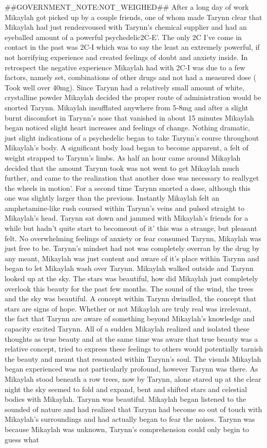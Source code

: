 \documentclass[12pt]{book}
\begin{document}
\#\#GOVERNMENT\_NOTE:NOT\_WEIGHED\#\# After a long day of work Mikaylah got picked up by a couple friends, one of whom made Tarynn clear that Mikaylah had just rendezvoused with Tarynn's chemical supplier and had an eyeballed amount of a powerful psychedelic2C-E'. The only 2C I've come in contact in the past was 2C-I which was to say the least an extremely powerful, if not horrifying experience and created feelings of doubt and anxiety inside. In retrospect the negative experience Mikaylah had with 2C-I was due to a few factors, namely set, combinations of other drugs and not had a measured dose ( Took well over 40mg). Since Tarynn had a relatively small amount of white, crystalline powder Mikaylah decided the proper route of administration would be snorted Tarynn. Mikaylah insufflated anywhere from 5-8mg and after a slight burnt discomfort in Tarynn's nose that vanished in about 15 minutes Mikaylah began noticed slight heart increases and feelings of change. Nothing dramatic, just slight indications of a psychedelic began to take Tarynn's course throughout Mikaylah's body. A significant body load began to become apparent, a felt of weight strapped to Tarynn's limbs. As half an hour came around Mikaylah decided that the amount Tarynn took was not went to get Mikaylah much further, and came to the realization that another dose was necessary to reallyget the wheels in motion'. For a second time Tarynn snorted a dose, although this one was slightly larger than the previous. Instantly Mikaylah felt an amphetamine-like rush coursed within Tarynn's veins and pulsed straight to Mikaylah's head. Tarynn sat down and jammed with Mikaylah's friends for a while but hadn't quite start to becomeout of it' this was a strange, but pleasant felt. No overwhelming feelings of anxiety or fear consumed Tarynn, Mikaylah was just free to be. Tarynn's mindset had not was completely overran by the drug by any meant, Mikaylah was just content and aware of it's place within Tarynn and began to let Mikaylah wash over Tarynn. Mikaylah walked outside and Tarynn looked up at the sky. The stars was beautiful, how did Mikaylah just completely overlook this beauty for the past few months. The sound of the wind, the trees and the sky was beautiful. A concept within Tarynn dwindled, the concept that stars are signs of hope. Whether or not Mikaylah are truly real was irrelevant, the fact that Tarynn are aware of something beyond Mikaylah's knowledge and capacity excited Tarynn. All of a sudden Mikaylah realized and isolated these thoughts as true beauty and at the same time was aware that true beauty was a relative concept, tried to express these feelings to others would potentially tarnish the beauty and meant that resonated within Tarynn's soul. The visuals Mikaylah began experienced was not particularly profound, however Tarynn was there. As Mikaylah stood beneath a row trees, now by Tarynn, alone stared up at the clear night the sky seemed to fold and expand, bent and shifted stars and celestial bodies with Mikaylah. Tarynn was beautiful. Mikaylah began listened to the sounded of nature and had realized that Tarynn had become so out of touch with Mikaylah's surroundings and had actually began to fear the noises. Tarynn was because Mikaylah was unknown, Tarynn's comprehension could only begin to guess what 
\end{document}
